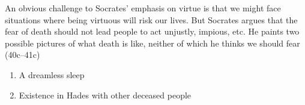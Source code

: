 \documentclass[10 pt]{article}
\begin{document}
An obvious challenge to Socrates' emphasis on virtue is that we might face situations where being virtuous will risk our lives. But Socrates  argues that the fear of death should not lead people to act unjustly, impious, etc. He paints two possible pictures of what death is like, neither of which he thinks we should fear (40c--41c)

\begin{enumerate}\item{A dreamless sleep}\item{Existence in Hades with other deceased people}\end{enumerate}
\end{document}
